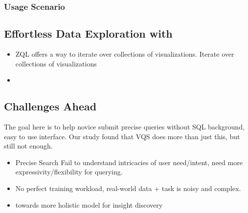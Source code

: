 \subsubsection{Usage Scenario}
\subsection{Effortless Data Exploration with \zv}
\begin{itemize}
	\item ZQL offers a way to iterate over collections of visualizations\cite{Wongsuphasawat2016}. Iterate over collections of visualizations \cite{Siddiqui}
	\item 
\end{itemize}

\subsection{Challenges Ahead}
The goal here is to help novice submit precise queries without SQL background, easy to use interface. Our study found that VQS does more than just this, but still not enough.
\begin{itemize}
	\item Precise Search Fail to understand intricacies of user need/intent, need more expressivity/flexibility for querying.
	\item  No perfect training workload, real-world data + task is noisy and complex. 
	\item towards more holistic model for insight discovery
\end{itemize}
